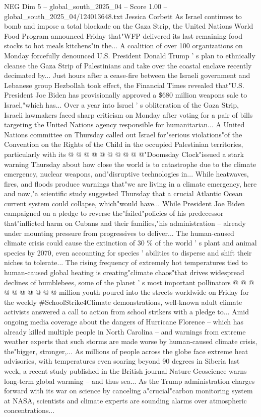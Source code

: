 \begin{textsample}{NEG Dim 5 – global\_south\_2025\_04 – Score 1.00 – global\_south\_2025\_04/124013648.txt}  \label{ex:f5_neg_369}
Jessica Corbett As Israel continues to bomb and impose a total blockade on the Gaza Strip, the United Nations World Food Program announced Friday that"WFP delivered its last remaining food stocks to hot meals kitchens"in the...
A coalition of over 100 organizations on Monday forcefully denounced U.S.
President Donald Trump ' s plan to ethnically cleanse the Gaza Strip of Palestinians and take over the coastal enclave recently decimated by...
Just hours after a cease-fire between the Israeli government and Lebanese group Hezbollah took effect, the Financial Times revealed that"U.S.
President Joe Biden has provisionally approved a \$680 million weapons sale to Israel,"which has...
Over a year into Israel ' s obliteration of the Gaza Strip, Israeli lawmakers faced sharp criticism on Monday after voting for a pair of bills targeting the United Nations agency responsible for humanitarian...
A United Nations committee on Thursday called out Israel for"serious violations"of the Convention on the Rights of the Child in the occupied Palestinian territories, particularly with its @ @ @ @ @ @ @ @ @ @"Doomsday Clock"issued a stark warning Thursday about how close the world is to catastrophe due to the climate emergency, nuclear weapons, and"disruptive technologies in...
While heatwaves, fires, and floods produce warnings that"we are living in a climate emergency, here and now,"a scientific study suggested Thursday that a crucial Atlantic Ocean current system could collapse, which"would have...
While President Joe Biden campaigned on a pledge to reverse the"failed"policies of his predecessor that"inflicted harm on Cubans and their families,"his administration -- already under mounting pressure from progressives to deliver...
The human-caused climate crisis could cause the extinction of 30 \% of the world ' s plant and animal species by 2070, even accounting for species ' abilities to disperse and shift their niches to tolerate...
The rising frequency of extremely hot temperatures tied to human-caused global heating is creating"climate chaos"that drives widespread declines of bumblebees, some of the planet ' s most important pollinators @ @ @ @ @ @ @ @ @ @ million youth poured into the streets worldwide on Friday for the weekly \#SchoolStrike4Climate demonstrations, well-known adult climate activists answered a call to action from school strikers with a pledge to...
Amid ongoing media coverage about the dangers of Hurricane Florence -- which has already killed multiple people in North Carolina -- and warnings from extreme weather experts that such storms are made worse by human-caused climate crisis, the"bigger, stronger,...
As millions of people across the globe face extreme heat advisories, with temperatures even soaring beyond 90 degrees in Siberia last week, a recent study published in the British journal Nature Geoscience warns long-term global warming -- and thus sea...
As the Trump administration charges forward with its war on science by canceling a"crucial"carbon monitoring system at NASA, scientists and climate experts are sounding alarms over atmospheric concentrations...

\end{textsample}
